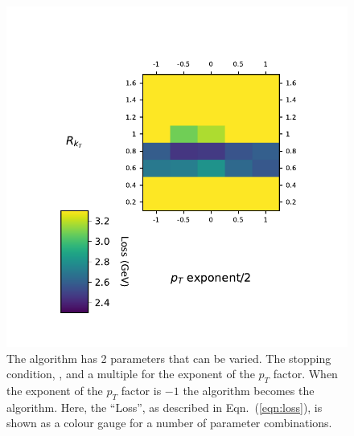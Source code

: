     \begin{figure}[!t]
        \begin{minipage}[c]{0.6\textwidth}
            \includegraphics[width=1\textwidth]{graphics/trangle_scan_genkt}
        \end{minipage}\hfill
        \begin{minipage}[c]{0.35\textwidth}
            \caption{The \genkt{} algorithm has 2 parameters that can be varied.
                The stopping condition, \ktstoppingdeltar{}, and a multiple for the exponent of the \(p_T\) factor.
                When the exponent of the \(p_T\) factor is \(-1\) the algorithm becomes the \antikt{} algorithm.
                Here, the ``Loss'', as described in Eqn.~(\ref{eqn:loss}), is shown as a colour gauge for a number of parameter combinations.
             }\label{fig:scan_genkt}
        \end{minipage}
    \end{figure}    

